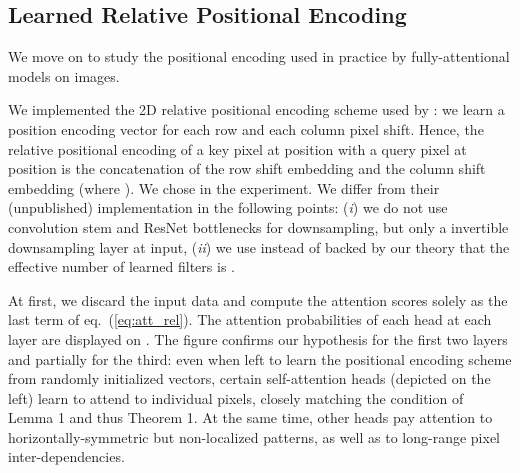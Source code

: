 \documentclass{article} \usepackage{iclr2020_conference,times}
\begin{document}
\subsection{Learned Relative Positional Encoding}


We move on to study the positional encoding used in practice by fully-attentional models on images.


We implemented the 2D relative positional encoding scheme used by \citep{ramachandran2019standaloneselfattention,belloAttentionAugmentedConvolutional2019}:
we learn a  position encoding vector for each row and each column pixel shift.
Hence, the relative positional encoding of a key pixel at position  with a query pixel at position  is the concatenation of the row shift embedding  and the column shift embedding  (where ).
We chose  in the experiment.
We differ from their (unpublished) implementation in the following points:
(\emph{i}) we do not use convolution stem and ResNet bottlenecks for downsampling, but only a  invertible downsampling layer \citep{jacobsen2018irevnet} at input,
(\emph{ii}) we use  instead of  backed by our theory that the effective number of learned filters is .



At first, we discard the input data and compute the attention scores solely as the last term of eq.~(\ref{eq:att_rel}).
The attention probabilities of each head at each layer are displayed on .
The figure confirms our hypothesis for the first two layers and partially for the third: even when left to learn the positional encoding scheme from randomly initialized vectors, certain self-attention heads (depicted on the left) learn to attend to individual pixels, closely matching the condition of Lemma 1 and thus Theorem 1.
At the same time, other heads pay attention to horizontally-symmetric but non-localized patterns, as well as to long-range pixel inter-dependencies.
\end{document}
